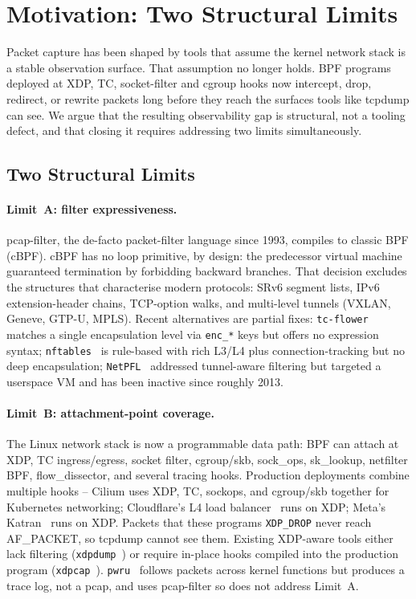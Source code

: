 \section{Motivation: Two Structural Limits}
\label{sec:motivation}

Packet capture has been shaped by tools that assume the kernel network
stack is a stable observation surface. That assumption no longer
holds. BPF programs deployed at XDP, TC, socket-filter and cgroup hooks
now intercept, drop, redirect, or rewrite packets long before they
reach the surfaces tools like tcpdump can see. We argue that
the resulting observability gap is structural, not a tooling defect,
and that closing it requires addressing two limits simultaneously.

\subsection{Two Structural Limits}
\label{sec:two-limits}

\paragraph{Limit~A: filter expressiveness.}
pcap-filter, the de-facto packet-filter language since 1993,
compiles to classic BPF (cBPF). cBPF has no loop primitive, by design:
the predecessor virtual machine guaranteed termination by forbidding
backward branches. That decision excludes the structures that
characterise modern protocols: SRv6 segment lists, IPv6 extension-header
chains, TCP-option walks, and multi-level tunnels (VXLAN, Geneve, GTP-U,
MPLS). Recent alternatives are partial fixes:
\texttt{tc-flower}~\cite{tcflower} matches a single encapsulation level
via \texttt{enc\_*} keys but offers no expression syntax;
\texttt{nftables}~\cite{nftables_wiki} is rule-based with rich L3/L4
plus connection-tracking but no deep encapsulation;
\texttt{NetPFL}~\cite{ciminiera2010netpfl} addressed tunnel-aware
filtering but targeted a userspace VM and has been inactive since
roughly 2013.

\paragraph{Limit~B: attachment-point coverage.}
The Linux network stack is now a programmable data path: BPF can
attach at XDP, TC ingress/egress, socket filter, cgroup/skb,
sock\_ops, sk\_lookup, netfilter BPF, flow\_dissector, and several
tracing hooks. Production deployments combine multiple hooks --
Cilium uses XDP, TC, sockops, and cgroup/skb together for Kubernetes
networking; Cloudflare's L4 load balancer~\cite{cloudflare_unimog} runs
on XDP; Meta's Katran~\cite{shukla2020katran} runs on XDP. Packets
that these programs \texttt{XDP\_DROP} never reach AF\_PACKET, so
tcpdump cannot see them. Existing XDP-aware tools either
lack filtering (\texttt{xdpdump}~\cite{xdptools_xdpdump}) or require
in-place hooks compiled into the production program
(\texttt{xdpcap}~\cite{cloudflare2019xdpcap}). \texttt{pwru}~\cite{cilium_pwru}
follows packets across kernel functions but produces a trace log, not
a pcap, and uses pcap-filter so does not address Limit~A.

